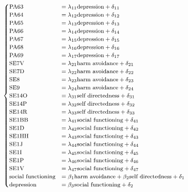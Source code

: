 \documentclass[11pt]{article}
\begin{document}
\begin{equation}
    \footnotesize
    \begin{cases}
    \textrm{PA63}  & = \lambda_{11} \textrm{depression} + \delta_{11} \\
    \textrm{PA64}  & = \lambda_{12} \textrm{depression} + \delta_{12} \\
    \textrm{PA65}  & = \lambda_{13} \textrm{depression} + \delta_{13} \\
    \textrm{PA66}  & = \lambda_{14} \textrm{depression} + \delta_{14} \\
    \textrm{PA67}  & = \lambda_{15} \textrm{depression} + \delta_{15} \\
    \textrm{PA68}  & = \lambda_{16} \textrm{depression} + \delta_{16} \\
    \textrm{PA69}  & = \lambda_{17} \textrm{depression} + \delta_{17} \\
    \textrm{SE7V}  & = \lambda_{21} \textrm{harm avoidance} + \delta_{21} \\
    \textrm{SE7D}  & = \lambda_{22} \textrm{harm avoidance} + \delta_{22} \\
    \textrm{SE8}   & = \lambda_{23} \textrm{harm avoidance} + \delta_{23} \\
    \textrm{SE9}   & = \lambda_{24} \textrm{harm avoidance} + \delta_{24} \\
    \textrm{SE14O} & = \lambda_{31} \textrm{self directedness} + \delta_{31} \\
    \textrm{SE14P} & = \lambda_{32} \textrm{self directedness} + \delta_{32} \\
    \textrm{SE14R} & = \lambda_{33} \textrm{self directedness} + \delta_{33} \\
    \textrm{SE1BB} & = \lambda_{41} \textrm{social functioning} + \delta_{41} \\
    \textrm{SE1D}  & = \lambda_{42} \textrm{social functioning} + \delta_{42} \\
    \textrm{SE1HH} & = \lambda_{43} \textrm{social functioning} + \delta_{43} \\
    \textrm{SE1J}  & = \lambda_{44} \textrm{social functioning} + \delta_{44} \\
    \textrm{SE1I}  & = \lambda_{45} \textrm{social functioning} + \delta_{45} \\
    \textrm{SE1P}  & = \lambda_{46} \textrm{social functioning} + \delta_{46} \\
    \textrm{SE1V}  & = \lambda_{47} \textrm{social functioning} + \delta_{47} \\
    \textrm{social functioning} & = \beta_1 \textrm{harm avoidance} + \beta_2 \textrm{self directedness} + \delta_1 \\
    \textrm{depression} & = \beta_3 \textrm{social functioning} + \delta_2
    \end{cases}
\end{equation}
\end{document}

